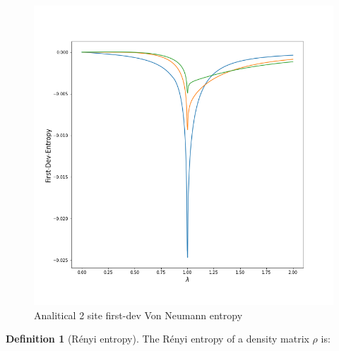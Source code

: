 \documentclass[12pt,a4paper]{book}
\theoremstyle{definition}
\newtheorem{definition}{Definition}[section]
\begin{document}
\begin{figure}[h]
	\centering
	\includegraphics[width=0.7\linewidth]{graphs/firstdev_entropy_3gammas}
	\caption{Analitical 2 site first-dev Von Neumann entropy}
	\label{fig:firstdeventropy3gammas}
\end{figure}

\clearpage
\begin{definition}[Rényi entropy]
	The Rényi entropy of a density matrix $\rho$ is:

\end{definition}
\end{document}
